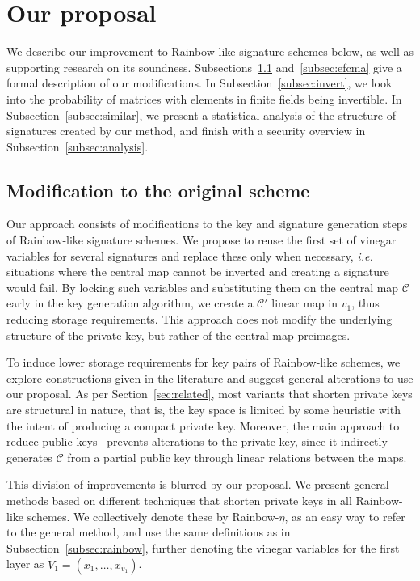 \documentclass[draft, 12pt, a4paper, oneside]{memoir}
\theoremstyle{definition}
\begin{document}
\section{Our proposal}\label{sec:proposal}

We describe our improvement to Rainbow-like signature schemes below, as
well as supporting research on its soundness. Subsections~\ref{subsec:scheme}
and~\ref{subsec:efcma} give a formal description of our modifications. In
Subsection~\ref{subsec:invert}, we look into the probability of matrices with
elements in finite fields being invertible. In Subsection~\ref{subsec:similar},
we present a statistical analysis of the structure of signatures created by our
method, and finish with a security overview in
Subsection~\ref{subsec:analysis}.

\subsection{Modification to the original scheme}\label{subsec:scheme}

Our approach consists of modifications to the key and signature generation
steps of Rainbow-like signature schemes. We propose to reuse the first set of
vinegar variables for several signatures and replace these only when necessary,
\emph{i.e.} situations where the central map cannot be inverted and creating a
signature would fail. By locking such variables and substituting them on the
central map $\mathcal{C}$ early in the key generation algorithm, we create a
$\mathcal{C}'$ linear map in $v_{1}$, thus reducing storage requirements. This
approach does not modify the underlying structure of the private key, but
rather of the central map preimages.

To induce lower storage requirements for key pairs of Rainbow-like schemes, we
explore constructions given in the literature and suggest general alterations
to use our proposal. As per Section~\ref{sec:related}, most variants that
shorten private keys are structural in nature, that is, the key space is
limited by some heuristic with the intent of producing a compact private key.
Moreover, the main approach to reduce public keys~\cite{Petzoldt:201307}
prevents alterations to the private key,
since it indirectly generates $\mathcal{C}$ from a partial public key through
linear relations between the maps.

This division of improvements is blurred by our proposal. We present general
methods based on different techniques that shorten private keys in all
Rainbow-like schemes. We collectively denote these by Rainbow-$\eta$, as an easy way to refer to the general method, and use
the same definitions as in Subsection~\ref{subsec:rainbow}, further denoting
the vinegar variables for the first layer as
$\widetilde{V}_{1} = (x_{1}, \dots, x_{v_{1}})$.
\end{document}
